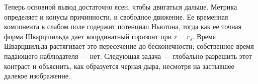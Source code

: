 Теперь основной вывод достаточно ясен, чтобы двигаться дальше. Метрика определяет и конусы причинности, и свободное движение. Ее временная компонента в слабом поле содержит потенциал Ньютона, тогда как ее точная форма Шварцшильда дает координатный горизонт при \(r=r_s\). Время Шварцшильда растягивает это пересечение до бесконечности; собственное время падающего наблюдателя — нет. Следующая задача — глобально разрешить этот контраст и объяснить, как образуется черная дыра, несмотря на застывшее далекое изображение.
